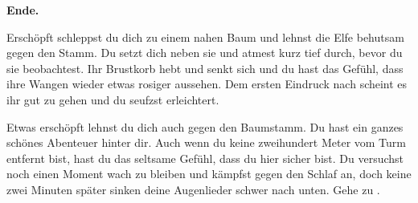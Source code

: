 \textbf{Ende.}


Erschöpft schleppst du dich zu einem nahen Baum und lehnst die Elfe behutsam gegen den Stamm. Du setzt dich neben sie und atmest kurz tief durch, bevor du sie beobachtest. Ihr Brustkorb hebt und senkt sich und du hast das Gefühl, dass ihre Wangen wieder etwas rosiger aussehen. Dem ersten Eindruck nach scheint es ihr gut zu gehen und du seufzst erleichtert.

Etwas erschöpft lehnst du dich auch gegen den Baumstamm. Du hast ein ganzes schönes Abenteuer hinter dir. Auch wenn du keine zweihundert Meter vom Turm entfernt bist, hast du das seltsame Gefühl, dass du hier sicher bist. Du versuchst noch einen Moment wach zu bleiben und kämpfst gegen den Schlaf an, doch keine zwei Minuten später sinken deine Augenlieder schwer nach unten.
Gehe zu .
